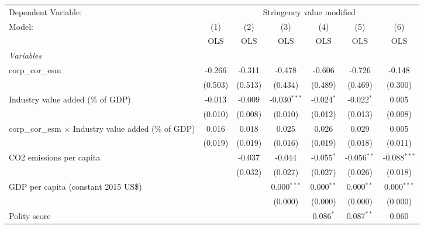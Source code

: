 
\begingroup
\centering
\begin{tabular}{lcccccc}
   \toprule
   Dependent Variable: & \multicolumn{6}{c}{Stringency value modified}\\
   Model:                                                       & (1)     & (2)     & (3)            & (4)          & (5)           & (6)\\  
                                                                &  OLS    & OLS     & OLS            & OLS          & OLS           & OLS\\  
   \midrule
   \emph{Variables}\\
   corp\_cor\_esm                                               & -0.266  & -0.311  & -0.478         & -0.606       & -0.726        & -0.148\\   
                                                                & (0.503) & (0.513) & (0.434)        & (0.489)      & (0.469)       & (0.300)\\   
   Industry value added (\% of GDP)                             & -0.013  & -0.009  & -0.030$^{***}$ & -0.024$^{*}$ & -0.022$^{*}$  & 0.005\\   
                                                                & (0.010) & (0.008) & (0.010)        & (0.012)      & (0.013)       & (0.008)\\   
   corp\_cor\_esm $\times$ Industry value added (\% of GDP)     & 0.016   & 0.018   & 0.025          & 0.026        & 0.029         & 0.005\\   
                                                                & (0.019) & (0.019) & (0.016)        & (0.019)      & (0.018)       & (0.011)\\   
   CO2 emissions per capita                                     &         & -0.037  & -0.044         & -0.055$^{*}$ & -0.056$^{**}$ & -0.088$^{***}$\\   
                                                                &         & (0.032) & (0.027)        & (0.027)      & (0.026)       & (0.018)\\   
   GDP per capita (constant 2015 US\$)                          &         &         & 0.000$^{***}$  & 0.000$^{**}$ & 0.000$^{**}$  & 0.000$^{***}$\\   
                                                                &         &         & (0.000)        & (0.000)      & (0.000)       & (0.000)\\   
   Polity score                                                 &         &         &                & 0.086$^{*}$  & 0.087$^{**}$  & 0.060\\   

\end{tabular}
